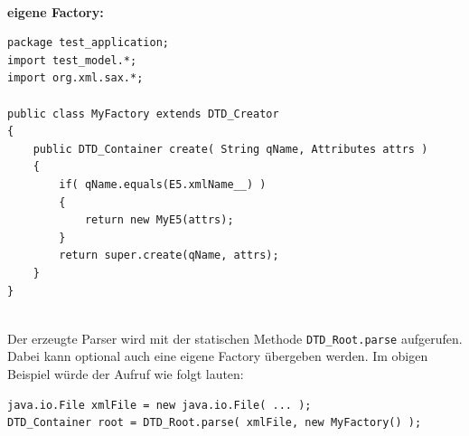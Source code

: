 \documentclass [a4paper,12pt] {scrartcl}
\begin{document}
~\\[4ex]
\begin{minipage}{\linewidth}
\textbf{eigene Factory:}
\begin{verbatim}
package test_application;
import test_model.*;
import org.xml.sax.*;

public class MyFactory extends DTD_Creator
{
    public DTD_Container create( String qName, Attributes attrs )
    {
        if( qName.equals(E5.xmlName__) )
        {
            return new MyE5(attrs);
        }
        return super.create(qName, attrs);
    }
}
\end{verbatim}
\end{minipage}
~\\[4ex]
Der erzeugte Parser wird mit der statischen Methode \texttt{DTD\_Root.parse} aufgerufen.
Dabei kann optional auch eine eigene Factory {\"u}bergeben werden. Im obigen Beispiel
w{\"u}rde der Aufruf wie folgt lauten:
\begin{verbatim}
java.io.File xmlFile = new java.io.File( ... );
DTD_Container root = DTD_Root.parse( xmlFile, new MyFactory() );
\end{verbatim}
\end{document}
